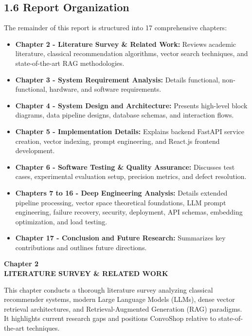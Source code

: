 \documentclass[12pt,a4paper]{article}
\begin{document}
\subsection*{1.6 Report Organization}
\label{sec:1.6}
The remainder of this report is structured into 17 comprehensive chapters:
\begin{itemize}
    \item \textbf{Chapter 2 - Literature Survey \& Related Work:} Reviews academic literature, classical recommendation algorithms, vector search techniques, and state-of-the-art RAG methodologies.
    \item \textbf{Chapter 3 - System Requirement Analysis:} Details functional, non-functional, hardware, and software requirements.
    \item \textbf{Chapter 4 - System Design and Architecture:} Presents high-level block diagrams, data pipeline designs, database schemas, and interaction flows.
    \item \textbf{Chapter 5 - Implementation Details:} Explains backend FastAPI service creation, vector indexing, prompt engineering, and React.js frontend development.
    \item \textbf{Chapter 6 - Software Testing \& Quality Assurance:} Discusses test cases, experimental evaluation setup, precision metrics, and defect resolution.
    \item \textbf{Chapters 7 to 16 - Deep Engineering Analysis:} Details extended pipeline processing, vector space theoretical foundations, LLM prompt engineering, failure recovery, security, deployment, API schemas, embedding optimization, and load testing.
    \item \textbf{Chapter 17 - Conclusion and Future Research:} Summarizes key contributions and outlines future directions.
\end{itemize}

\newpage

\label{chap:2}
\begin{center}
{\fontsize{14}{17}\bfseries Chapter 2\\[6pt]}
{\fontsize{16}{20}\bfseries LITERATURE SURVEY \& RELATED WORK\\[10pt]}
\end{center}

This chapter conducts a thorough literature survey analyzing classical recommender systems, modern Large Language Models (LLMs), dense vector retrieval architectures, and Retrieval-Augmented Generation (RAG) paradigms. It highlights current research gaps and positions ConvoShop relative to state-of-the-art techniques.
\end{document}
